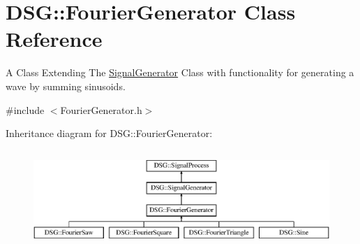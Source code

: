 \hypertarget{classDSG_1_1FourierGenerator}{\section{D\+S\+G\+:\+:Fourier\+Generator Class Reference}
\label{classDSG_1_1FourierGenerator}
}


A Class Extending The \hyperlink{classDSG_1_1SignalGenerator}{Signal\+Generator} Class with functionality for generating a wave by summing sinusoids.  




{\ttfamily \#include $<$Fourier\+Generator.\+h$>$}

Inheritance diagram for D\+S\+G\+:\+:Fourier\+Generator\+:\begin{figure}[H]
\begin{center}
\leavevmode
\includegraphics[height=3.708609cm]{classDSG_1_1FourierGenerator}
\end{center}
\end{figure}
